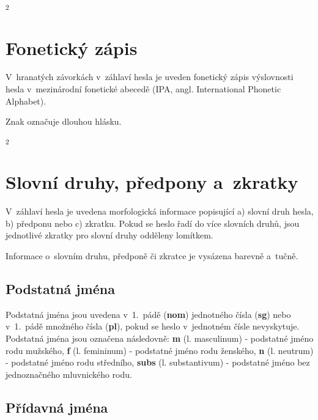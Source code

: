 \blspace
  \dicEntry {}\textsuperscript{2} \dicsymFrequent
\blspace

\section{Fonetický zápis}

V~hranatých závorkách v~záhlaví hesla je uveden fonetický zápis výslovnosti hesla v~mezinárodní fonetické abecedě (IPA, angl. International Phonetic Alphabet).

\blspace
  \dicEntry {} 
\blspace

Znak \uv{{\textlengthmark}} označuje dlouhou hlásku.

\blspace
  \dicEntry {}\textsuperscript{2} 
\blspace

\section{Slovní druhy, předpony a~zkratky}

V~záhlaví hesla je uvedena morfologická informace popisující a) slovní druh hesla, b) předponu nebo c) zkratku. Pokud se heslo řadí do více slovních druhů, jsou jednotlivé zkratky pro slovní druhy odděleny lomítkem.

\blspace
  \dicEntry {} 
\blspace

Informace o~slovním druhu, předponě či zkratce je vysázena barevně a~tučně.

\subsection*{Podstatná jména}

Podstatná jména jsou uvedena v~1.~pádě (\textbf{nom}) jednotného čísla (\textbf{sg}) nebo v~1.~pádě množného čísla (\textbf{pl}), pokud se heslo v~jednotném čísle nevyskytuje. Podstatná jména jsou označena následovně: \textbf{m} (l. masculinum) - podstatné jméno rodu mužského,
\textbf{f} (l. femininum) - podstatné jméno rodu ženského, \textbf{n} (l. neutrum) - podstatné jméno rodu středního, \textbf{subs} (l. substantivum) - podstatné jméno bez jednoznačného mluvnického rodu.

\blspace
  \dicEntry {} 
  \dicEntry {} 
\blspace

\subsection*{Přídavná jména}

